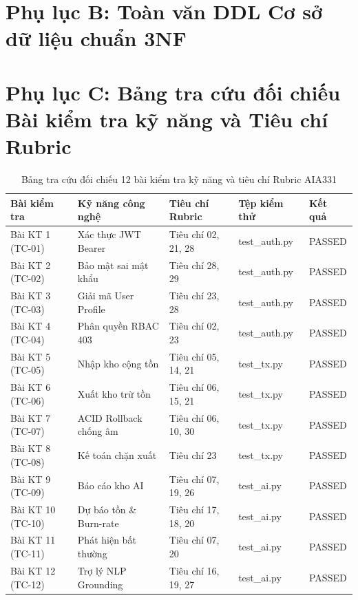 \section*{Phụ lục B: Toàn văn DDL Cơ sở dữ liệu chuẩn 3NF}


\section*{Phụ lục C: Bảng tra cứu đối chiếu Bài kiểm tra kỹ năng và Tiêu chí Rubric}

\begin{table}[h!]
\centering
\caption{Bảng tra cứu đối chiếu 12 bài kiểm tra kỹ năng và tiêu chí Rubric AIA331}
\begin{tabular}{|l|p{4.5cm}|p{3.5cm}|p{2.5cm}|l|}
\hline
\rowcolor{tablehead}
\textbf{Bài kiểm tra} & \textbf{Kỹ năng công nghệ} & \textbf{Tiêu chí Rubric} & \textbf{Tệp kiểm thử} & \textbf{Kết quả} \\ \hline
Bài KT 1 (TC-01) & Xác thực JWT Bearer & Tiêu chí 02, 21, 28 & test\_auth.py & PASSED \\ \hline
Bài KT 2 (TC-02) & Bảo mật sai mật khẩu & Tiêu chí 28, 29 & test\_auth.py & PASSED \\ \hline
Bài KT 3 (TC-03) & Giải mã User Profile & Tiêu chí 23, 28 & test\_auth.py & PASSED \\ \hline
Bài KT 4 (TC-04) & Phân quyền RBAC 403 & Tiêu chí 02, 23 & test\_auth.py & PASSED \\ \hline
Bài KT 5 (TC-05) & Nhập kho cộng tồn & Tiêu chí 05, 14, 21 & test\_tx.py & PASSED \\ \hline
Bài KT 6 (TC-06) & Xuất kho trừ tồn & Tiêu chí 06, 15, 21 & test\_tx.py & PASSED \\ \hline
Bài KT 7 (TC-07) & ACID Rollback chống âm & Tiêu chí 06, 10, 30 & test\_tx.py & PASSED \\ \hline
Bài KT 8 (TC-08) & Kế toán chặn xuất & Tiêu chí 23 & test\_tx.py & PASSED \\ \hline
Bài KT 9 (TC-09) & Báo cáo kho AI & Tiêu chí 07, 19, 26 & test\_ai.py & PASSED \\ \hline
Bài KT 10 (TC-10) & Dự báo tồn \& Burn-rate & Tiêu chí 17, 18, 20 & test\_ai.py & PASSED \\ \hline
Bài KT 11 (TC-11) & Phát hiện bất thường & Tiêu chí 07, 20 & test\_ai.py & PASSED \\ \hline
Bài KT 12 (TC-12) & Trợ lý NLP Grounding & Tiêu chí 16, 19, 27 & test\_ai.py & PASSED \\ \hline
\end{tabular}
\end{table}
